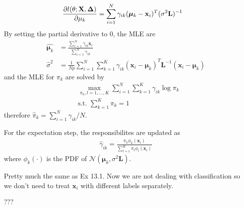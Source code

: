 \begin{exercise}
\begin{exerciseSection}
\begin{align}
      \pdv{l(\theta;\mathbf{X}, \mathbf{\Delta})}{\mathbf{\mu}_k} &=
      \sum_{i=1}^N \gamma_{ik} (\bm{\mu}_k - \mathbf{x}_i)^T
      (\sigma^2\mathbf{L})^{-1}
    \end{align}
    By setting the partial derivative to 0, the MLE are
    \begin{align}
      \hat{\bm{\mu}_k} & =
      \frac{\sum_{i=1}^N\gamma_{ik}\mathbf{x}_i} {\sum_{i=1}^N\gamma_{ik}} \\
      \hat{\sigma}^2 &= \frac{1}{Np} \sum_{i=1}^N\sum_{k=1}^K \gamma_{ik}
      (\mathbf{x}_i - \bm{\mu}_k)^T \mathbf{L}^{-1} (\mathbf{x}_i - \bm{\mu}_k)
    \end{align}
    and the MLE for $\pi_k$ are solved by
    \begin{align}
      & \max_{\pi_k,l=1,\ldots,K}\sum_{i=1}^N\sum_{k=1}^K\gamma_{ik}\log\pi_k \\
      & \mbox{s.t. } \sum_{k=1}^{K}\pi_k=1
    \end{align}
    therefore $\hat{\pi}_k = \sum_{i=1}^N\gamma_{ik}/N$.
    
    For the expectation step, the responsibilites are updated as
    \begin{align}
      \hat{\gamma}_{ik} = \frac{\pi_k\phi_k(\mathbf{x}_i)}
      {\sum_{l=1}^K\pi_l\phi_l(\mathbf{x}_i)}
    \end{align}
    where $\phi_k(\cdot)$ is the PDF of $\mathcal{N}(\bm{\mu}_k,
    \sigma^2\mathbf{L})$.
  \end{exerciseSection}
  
  \begin{exerciseSection}
    Pretty much the same as Ex 13.1. Now we are not dealing with classification
    so we don't need to treat $\mathbf{x}_i$ with different labels separately.
  \end{exerciseSection}
\end{exercise}

\begin{exercise}
  ???
\end{exercise}

\begin{exercise}[(Program)]
\end{exercise}

\begin{exercise}[(Program)]
\end{exercise}

\begin{exercise}[(Program)]
\end{exercise}
  

